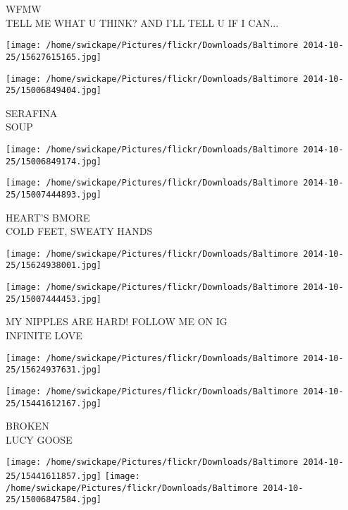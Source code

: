 \documentclass[10pt,letterpaper]{article}
\begin{document}
WFMW\\
TELL ME WHAT U THINK?  AND I'LL TELL U IF I CAN...\\
\pagebreak

\texttt{[image: /home/swickape/Pictures/flickr/Downloads/Baltimore 2014-10-25/15627615165.jpg]}

\vspace{0.25in}
\texttt{[image: /home/swickape/Pictures/flickr/Downloads/Baltimore 2014-10-25/15006849404.jpg]}

SERAFINA\\
SOUP\\
\pagebreak

\texttt{[image: /home/swickape/Pictures/flickr/Downloads/Baltimore 2014-10-25/15006849174.jpg]}

\vspace{0.25in}
\texttt{[image: /home/swickape/Pictures/flickr/Downloads/Baltimore 2014-10-25/15007444893.jpg]}

HEART'S BMORE\\
COLD FEET, SWEATY HANDS\\
\pagebreak

\texttt{[image: /home/swickape/Pictures/flickr/Downloads/Baltimore 2014-10-25/15624938001.jpg]}

\vspace{0.25in}
\texttt{[image: /home/swickape/Pictures/flickr/Downloads/Baltimore 2014-10-25/15007444453.jpg]}

MY NIPPLES ARE HARD!  FOLLOW ME ON IG\\
INFINITE LOVE\\
\pagebreak

\texttt{[image: /home/swickape/Pictures/flickr/Downloads/Baltimore 2014-10-25/15624937631.jpg]}

\vspace{0.25in}
\texttt{[image: /home/swickape/Pictures/flickr/Downloads/Baltimore 2014-10-25/15441612167.jpg]}

BROKEN\\
LUCY GOOSE\\
\pagebreak

\texttt{[image: /home/swickape/Pictures/flickr/Downloads/Baltimore 2014-10-25/15441611857.jpg]}
\texttt{[image: /home/swickape/Pictures/flickr/Downloads/Baltimore 2014-10-25/15006847584.jpg]}
\end{document}
